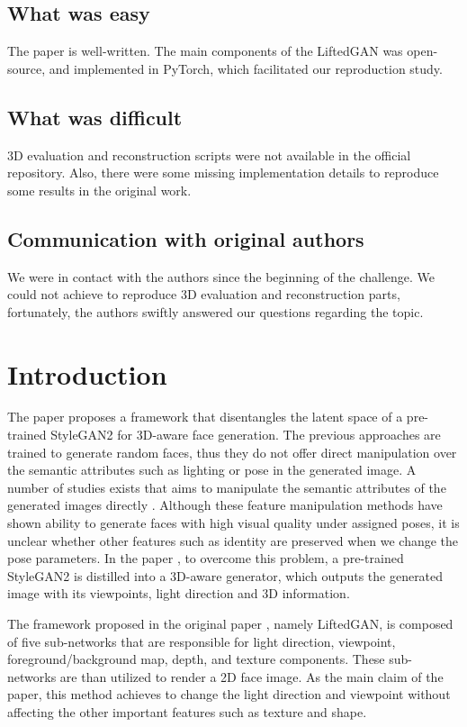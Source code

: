 \subsection*{What was easy}
The paper is well-written. The main components of the LiftedGAN was open-source, and implemented in PyTorch, which facilitated our reproduction study.

\subsection*{What was difficult}
3D evaluation and reconstruction scripts were not available in the official repository. Also, there were some missing implementation details to reproduce some results in the original work. 

\subsection*{Communication with original authors}
We were in contact with the authors since the beginning of the challenge. We could not achieve to reproduce 3D evaluation and reconstruction parts, fortunately, the authors swiftly answered our questions regarding the topic.

\newpage

\section{Introduction}

The paper \cite{shi2021lifting} proposes a framework that disentangles the latent space of a pre-trained StyleGAN2 \cite{karras2020analyzing} for 3D-aware face generation. The previous approaches are trained to generate random faces, thus they do not offer direct manipulation over the semantic attributes such as lighting or pose in the generated image. A number of studies exists that aims to manipulate the semantic attributes of the generated images directly \cite{tian2018crgan, 8099624, 8578974, deng2020disentangled, nguyenphuoc2019hologan}. Although these feature manipulation methods have shown ability to generate faces with high visual quality under assigned poses, it is unclear whether other features such as identity are preserved when we change the pose parameters. In the paper \cite{shi2021lifting}, to overcome this problem, a pre-trained StyleGAN2 is distilled into a 3D-aware generator, which outputs the generated image with its viewpoints, light direction and 3D information. 

The framework proposed in the original paper \cite{shi2021lifting}, namely LiftedGAN, is composed of five sub-networks that are responsible for light direction, viewpoint, foreground/background map, depth, and texture components. These sub-networks are than utilized to render a 2D face image. As the main claim of the paper, this method achieves to change the light direction and viewpoint without affecting the other important features such as texture and shape.


